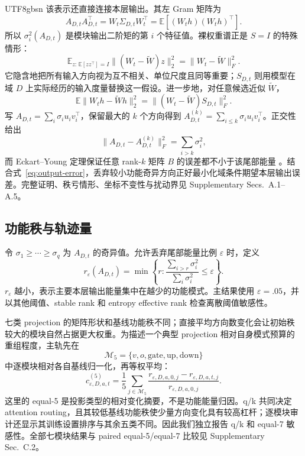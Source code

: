 \documentclass[letterpaper]{article} %
\begin{document}
\begin{CJK*}{UTF8}{gbsn}
该表示还直接连接本层输出。其左 Gram 矩阵为
\begin{equation}
A_{D,t}A_{D,t}^{\top}
=W_t\Sigma_{D,t}W_t^\top
=\mathbb E[(W_th)(W_th)^\top].
\label{eq:output-energy}
\end{equation}
所以 $\sigma_i^2(A_{D,t})$ 是模块输出二阶矩的第 $i$ 个特征值。裸权重谱正是 $S=I$ 的特殊情形：
\begin{equation}
\mathbb E_{z:\,\mathbb E[zz^\top]=I}
\|(W_t-\widetilde W)z\|_2^2
=\|W_t-\widetilde W\|_F^2.
\end{equation}
它隐含地把所有输入方向视为互不相关、单位尺度且同等重要；$S_{D,t}$ 则用模型在域 $D$ 上实际经历的输入度量替换这一假设。进一步地，对任意候选近似 $\widetilde W$，
\begin{equation}
\mathbb E\|W_th-\widetilde Wh\|_2^2
=\|(W_t-\widetilde W)S_{D,t}\|_F^2.
\label{eq:output-error}
\end{equation}
写 $A_{D,t}=\sum_i\sigma_i u_iv_i^\top$，保留最大的 $k$ 个方向得到
$A_{D,t}^{(k)}=\sum_{i\le k}\sigma_i u_iv_i^\top$。正交性给出
\begin{equation}
\|A_{D,t}-A_{D,t}^{(k)}\|_F^2=\sum_{i>k}\sigma_i^2,
\end{equation}
而 Eckart--Young 定理保证任意 rank-$k$ 矩阵 $B$ 的误差都不小于该尾部能量 \citep{eckart1936approximation}。结合式~\eqref{eq:output-error}，丢弃较小功能奇异方向正好最小化域条件期望本层输出误差。完整证明、秩亏情形、坐标不变性与扰动界见 Supplementary Secs.~A.1--A.5。

\subsection{功能秩与轨迹量}

令 $\sigma_1\ge\cdots\ge\sigma_q$ 为 $A_{D,t}$ 的奇异值。允许丢弃尾部能量比例 $\varepsilon$ 时，定义
\begin{equation}
r_\varepsilon(A_{D,t})
=\min\left\{r:
\frac{\sum_{i>r}\sigma_i^2}{\sum_i\sigma_i^2}\le\varepsilon
\right\}.
\label{eq:functional-rank}
\end{equation}
$r_\varepsilon$ 越小，表示主要本层输出能量集中在越少的功能模式。主结果使用 $\varepsilon=.05$，并以其他阈值、stable rank 和 entropy effective rank 检查离散阈值敏感性。

七类 projection 的矩阵形状和基线功能秩不同；直接平均方向数变化会让初始秩较大的模块自然占据更大权重。为描述一个典型 projection 相对自身模式预算的重组程度，主轨先在
\begin{equation}
\mathcal M_5=\{v,o,\mathrm{gate},\mathrm{up},\mathrm{down}\}
\end{equation}
中逐模块相对各自基线归一化，再等权平均：
\begin{equation}
c_{\varepsilon,D,a,t}^{(5)}
=\frac{1}{5}\sum_{j\in\mathcal M_5}
\frac{r_{\varepsilon,D,a,0,j}-r_{\varepsilon,D,a,t,j}}
{r_{\varepsilon,D,a,0,j}}.
\label{eq:relative-contraction}
\end{equation}
这里的 equal-5 是投影类型的相对变化摘要，不是功能能量归因。q/k 共同决定 attention routing，且其较低基线功能秩使少量方向变化具有较高杠杆；逐模块审计还显示其训练设置排序与其余五类不同。因此我们独立报告 q/k 和 equal-7 敏感性。全部七模块结果与 paired equal-5/equal-7 比较见 Supplementary Sec.~C.2。


\end{CJK*}
\end{document}
